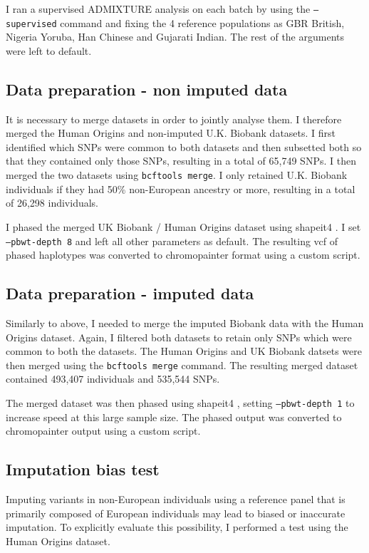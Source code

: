 I ran a supervised ADMIXTURE analysis on each batch by using the \texttt{--supervised} command and fixing the 4 reference populations as GBR British, Nigeria Yoruba, Han Chinese and Gujarati Indian. The rest of the arguments were left to default.

\subsection{Data preparation - non imputed data}

It is necessary to merge datasets in order to jointly analyse them. I therefore merged the Human Origins and non-imputed U.K. Biobank datasets. I first identified which SNPs were common to both datasets and then subsetted both so that they contained only those SNPs, resulting in a total of 65,749 SNPs. I then merged the two datasets using \texttt{bcftools merge}. I only retained U.K. Biobank individuals if they had 50\% non-European ancestry or more, resulting in a total of 26,298 individuals. 

I phased the merged UK Biobank / Human Origins dataset using shapeit4 \cite{delaneau2018integrative}. I set \texttt{--pbwt-depth 8} and left all other parameters as default. The resulting vcf of phased haplotypes was converted to chromopainter format using a custom script.  

\subsection{Data preparation - imputed data}

Similarly to above, I needed to merge the imputed Biobank data with the Human Origins dataset. Again, I filtered both datasets to retain only SNPs which were common to both the datasets. The Human Origins and UK Biobank datsets were then merged using the \texttt{bcftools merge} command. The resulting merged dataset contained 493,407 individuals and 535,544 SNPs.

The merged dataset was then phased using shapeit4 \cite{delaneau2018integrative}, setting \texttt{--pbwt-depth 1} to increase speed at this large sample size. The phased output was converted to chromopainter output using a custom script.


\subsection{Imputation bias test}

Imputing variants in non-European individuals using a reference panel that is primarily composed of European individuals may lead to biased or inaccurate imputation. To explicitly evaluate this possibility, I performed a test using the Human Origins dataset.
 
